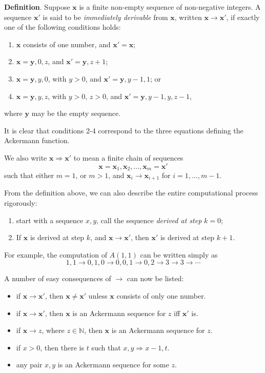 \documentclass[12pt]{article}
\begin{document}
\textbf{Definition}.  Suppose $\boldsymbol{x}$ is a finite non-empty sequence of non-negative integers.  A sequence $\boldsymbol{x}'$ is said to be \emph{immediately derivable} from $\boldsymbol{x}$, written $\boldsymbol{x}\longrightarrow \boldsymbol{x}'$, if exactly one of the following conditions holds:
\begin{enumerate}
\item $\boldsymbol{x}$ consists of one number, and $\boldsymbol{x}'=\boldsymbol{x}$;
\item $\boldsymbol{x}=\boldsymbol{y},0,z$, and $\boldsymbol{x}'=\boldsymbol{y},z+1$;
\item $\boldsymbol{x}=\boldsymbol{y},y,0$, with $y>0$, and $\boldsymbol{x}'=\boldsymbol{y},y-1,1$; or
\item $\boldsymbol{x}=\boldsymbol{y},y,z$, with $y>0$, $z>0$, and $\boldsymbol{x}'=\boldsymbol{y},y-1,y,z-1$,
\end{enumerate}
where $\boldsymbol{y}$ may be the empty sequence.

It is clear that conditions 2-4 correspond to the three equations defining the Ackermann function.

We also write $\boldsymbol{x}\Longrightarrow \boldsymbol{x}'$ to mean a finite chain of sequences 
$$\boldsymbol{x}=\boldsymbol{x}_1, \boldsymbol{x}_2, \ldots, \boldsymbol{x}_m=\boldsymbol{x}'$$
such that either $m=1$, or $m>1$, and $\boldsymbol{x}_i\rightarrow \boldsymbol{x}_{i+1}$ for $i=1,\ldots,m-1$.

From the definition above, we can also describe the entire computational process rigorously:
\begin{enumerate}
\item start with a sequence $x,y$, call the sequence \emph{derived at step} $k=0$;
\item If $\boldsymbol{x}$ is derived at step $k$, and $\boldsymbol{x}\longrightarrow \boldsymbol{x}'$, then $\boldsymbol{x}'$ is derived at step $k+1$.
\end{enumerate}
For example, the computation of $A(1,1)$ can be written simply as
$$1,1\longrightarrow 0,1,0 \longrightarrow 0,0,1 \longrightarrow 0,2 \longrightarrow 3 \longrightarrow 3 \longrightarrow \cdots$$

A number of easy consequences of $\longrightarrow$ can now be listed:
\begin{itemize}
\item if $\boldsymbol{x}\longrightarrow \boldsymbol{x}'$, then $\boldsymbol{x}\ne \boldsymbol{x}'$ unless $\boldsymbol{x}$ consists of only one number.
\item if $\boldsymbol{x}\longrightarrow \boldsymbol{x}'$, then $\boldsymbol{x}$ is an Ackermann sequence for $z$ iff $\boldsymbol{x}'$ is.
\item if $\boldsymbol{x}\longrightarrow z$, where $z\in \mathbb{N}$, then $\boldsymbol{x}$ is an Ackermann sequence for $z$.
\item if $x>0$, then there is $t$ such that $x,y \Longrightarrow x-1,t$.
\item any pair $x,y$ is an Ackermann sequence for some $z$.
\end{itemize}
\end{document}
